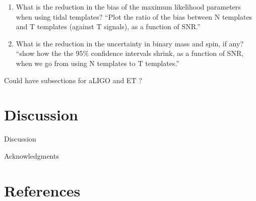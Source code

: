 \documentclass[aps,prd,amsmath,floats,floatfix, twocolumn,
superscriptaddress,nofootinbib,showpacs]{revtex4-1}
\begin{document}
\begin{enumerate}
\item What is the reduction in the bias of the maximum likelihood parameters
when using tidal templates?\newline
``Plot the ratio of the bias between N templates and T templates (against T
signals), as a function of SNR.''
\item What is the reduction in the uncertainty in binary mass and spin, if
any?\newline
``show how the the $95\%$ confidence intervals shrink, as a function of SNR, 
when we go from using N templates to T templates.''
\end{enumerate}



Could have subsections for aLIGO and ET ?


\section{Discussion}
Discussion

\begin{acknowledgments}
Acknowledgments
\end{acknowledgments}

\section*{References}

\end{document}
